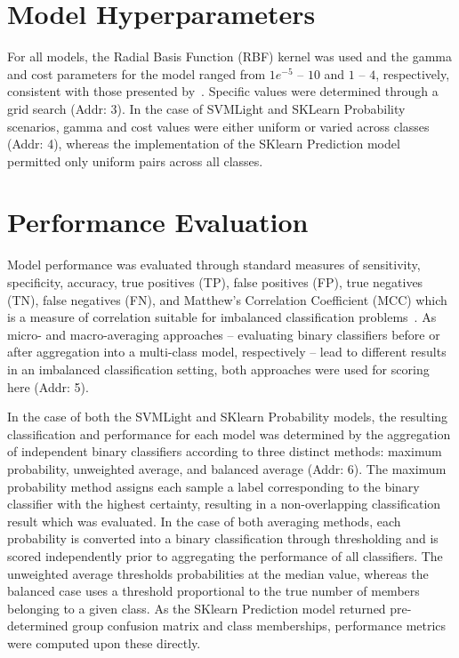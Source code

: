 \section{Model Hyperparameters}
For all models, the Radial Basis Function (RBF) kernel was used and the gamma and cost parameters for the model ranged
from $1e^{-5}$ -- $10$ and $1$ -- $4$, respectively, consistent with those presented by~\cite{mishra_prediction_2014}.
Specific values were determined through a grid search (Addr: 3). In the case of SVMLight and SKLearn Probability
scenarios, gamma and cost values were either uniform or varied across classes (Addr: 4), whereas the implementation of
the SKlearn Prediction model permitted only uniform pairs across all classes.

\section{Performance Evaluation}
Model performance was evaluated through standard measures of sensitivity, specificity, accuracy, true positives (TP),
false positives (FP), true negatives (TN), false negatives (FN), and Matthew's Correlation Coefficient (MCC) which is a
measure of correlation suitable for imbalanced classification problems~\cite{mcc2017optimal}. As micro- and
macro-averaging approaches -- evaluating binary classifiers before or after aggregation into a multi-class model,
respectively -- lead to different results in an imbalanced classification setting, both approaches were used for
scoring here (Addr: 5).

In the case of both the SVMLight and SKlearn Probability models, the resulting classification and performance for each
model was determined by the aggregation of independent binary classifiers according to three distinct methods: maximum
probability, unweighted average, and balanced average (Addr: 6). The maximum probability method assigns each sample a
label corresponding to the binary classifier with the highest certainty, resulting in a non-overlapping classification
result which was evaluated. In the case of both averaging methods, each probability is converted into a binary
classification through thresholding and is scored independently prior to aggregating the performance of all classifiers.
The unweighted average thresholds probabilities at the median value, whereas the balanced case uses a threshold
proportional to the true number of members belonging to a given class. As the SKlearn Prediction model returned
pre-determined group confusion matrix and class memberships, performance metrics were computed upon these directly.

